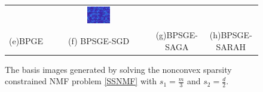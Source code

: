 \documentclass[letterpaper]{article} %
\begin{document}
\begin{figure}[!ht]
\begin{tabular}{cccc}
			&\includegraphics[width=0.24\textwidth]{figs/ORL_32_BPSGE_SARAH}\\
			(e)BPGE&(f) BPSGE-SGD&(g)BPSGE-SAGA&(h)BPSGE-SARAH
		\end{tabular}
		\caption{The basis images generated by solving the nonconvex sparsity constrained NMF problem \eqref{SSNMF}  with $s_{1}=\frac{m}{3}$ and $s_{2}=\frac{d}{2}$.}
		\label{basis_SSNMF_ORL_32}
	\end{figure}
\end{document}
